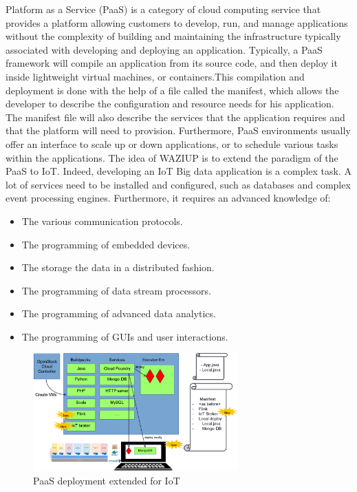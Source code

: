 Platform as a Service (PaaS) is a category of cloud computing service that provides a platform allowing customers to develop, run, and manage applications without the complexity of building and maintaining the infrastructure typically associated with developing and deploying an application.
Typically, a PaaS framework will compile an application from its source code, and then deploy it inside lightweight virtual machines, or containers.This compilation and deployment is done with the help of a file called the manifest, which allows the developer to describe the configuration and resource needs for his application.
The manifest file will also describe the services that the application requires and that the platform will need to provision.
Furthermore, PaaS environments usually offer an interface to scale up or down applications, or to schedule various tasks within the applications.
The idea of WAZIUP is to extend the paradigm of the PaaS to IoT.
Indeed, developing an IoT Big data application is a complex task.
A lot of services need to be installed and configured, such as databases and complex event processing engines.
Furthermore, it requires an advanced knowledge of:
\begin{itemize}
  \item The various communication protocols.
  \item The programming of embedded devices.
  \item The storage the data in a distributed fashion.
  \item The programming of data stream processors.
  \item The programming of advanced data analytics.
  \item The programming of GUIs and user interactions.
\end{itemize}

\begin{figure}[h!]
\centering
\includegraphics[width=0.7\textwidth]{figs/paas.png}
\caption{PaaS deployment extended for IoT}
\label{fig:paas}
\end{figure}

